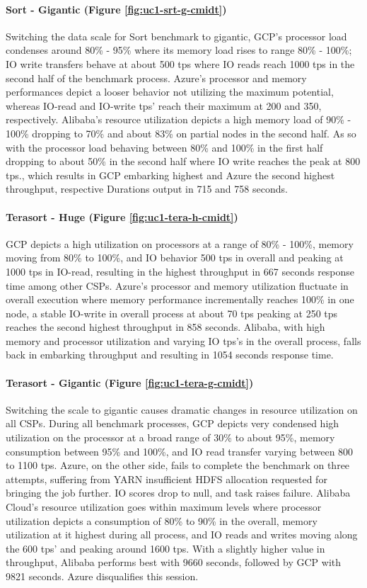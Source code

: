\documentclass[review]{elsarticle}
\begin{document}
\paragraph{Sort - Gigantic (Figure \ref{fig:uc1-srt-g-cmidt})}Switching the data scale for Sort benchmark to gigantic, GCP's processor load condenses around 80\% - 95\% where its memory load rises to range 80\% - 100\%; IO write transfers behave at about 500 tps where IO reads reach 1000 tps in the second half of the benchmark process. Azure's processor and memory performances depict a looser behavior not utilizing the maximum potential, whereas IO-read and IO-write tps' reach their maximum at 200 and 350, respectively. Alibaba's resource utilization depicts a high memory load of 90\% - 100\% dropping to 70\% and about 83\% on partial nodes in the second half. As so with the processor load behaving between 80\% and 100\% in the first half dropping to about 50\% in the second half where IO write reaches the peak at 800 tps., which results in GCP embarking highest and Azure the second highest throughput, respective Durations output in 715 and 758 seconds.

\paragraph{Terasort - Huge (Figure \ref{fig:uc1-tera-h-cmidt})}GCP depicts a high utilization on processors at a range of 80\% - 100\%, memory moving from 80\% to 100\%, and IO behavior 500 tps in overall and peaking at 1000 tps in IO-read, resulting in the highest throughput in 667 seconds response time among other CSPs. Azure's processor and memory utilization fluctuate in overall execution where memory performance incrementally reaches 100\% in one node, a stable IO-write in overall process at about 70 tps peaking at 250 tps reaches the second highest throughput in 858 seconds. Alibaba, with high memory and processor utilization and varying IO tps's in the overall process, falls back in embarking throughput and resulting in 1054 seconds response time.

\paragraph{Terasort - Gigantic (Figure \ref{fig:uc1-tera-g-cmidt})}Switching the scale to gigantic causes dramatic changes in resource utilization on all CSPs. During all benchmark processes, GCP depicts very condensed high utilization on the processor at a broad range of 30\% to about 95\%, memory consumption between 95\% and 100\%, and IO read transfer varying between 800 to 1100 tps. Azure, on the other side, fails to complete the benchmark on three attempts, suffering from YARN insufficient HDFS allocation requested for bringing the job further. IO scores drop to null, and task raises failure. Alibaba Cloud's resource utilization goes within maximum levels where processor utilization depicts a consumption of 80\% to 90\% in the overall, memory utilization at it highest during all process, and IO reads and writes moving along the 600 tps' and peaking around 1600 tps. With a slightly higher value in throughput, Alibaba performs best with 9660 seconds, followed by GCP with 9821 seconds. Azure disqualifies this session.
\end{document}
